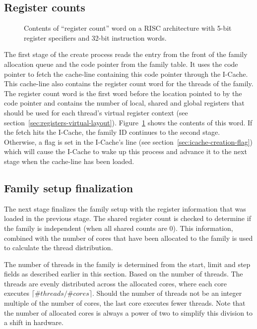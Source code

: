 \subsection{Register counts}

\begin{figure}
 \begin{center}
  
  \caption{Contents of ``register count'' word on a RISC architecture with 5-bit register specifiers and 32-bit instruction words.}
  \label{fig:reg-counts}
 \end{center}
\end{figure}

The first stage of the create process reads the entry from the front of the family allocation queue and the code pointer from the family table. It uses the code pointer to fetch the cache-line containing this code pointer through the I-Cache. This cache-line also contains the register count word for the threads of the family. The register count word is the first word before the location pointed to by the code pointer and contains the number of local, shared and global registers that should be used for each thread's virtual register context (see section~\ref{sec:registers-virtual-layout}). Figure~\ref{fig:reg-counts} shows the contents of this word. If the fetch hits the I-Cache, the family ID continues to the second stage. Otherwise, a flag is set in the I-Cache's line (see section~\ref{sec:icache-creation-flag}) which will cause the I-Cache to wake up this process and advance it to the next stage when the cache-line has been loaded.

\subsection{\label{sec:family-setup-finalization}Family setup finalization}
The next stage finalizes the family setup with the register information that was loaded in the previous stage. The shared register count is checked to determine if the family is independent (when all shared counts are 0). This information, combined with the number of cores that have been allocated to the family is used to calculate the thread distribution.

The number of threads in the family is determined from the start, limit and step fields as described earlier in this section. Based on the number of threads. The threads are evenly distributed across the allocated cores, where each core executes $\lceil \#threads / \#cores \rceil$. Should the number of threads not be an integer multiple of the number of cores, the last core executes fewer threads. Note that the number of allocated cores is always a power of two to simplify this division to a shift in hardware.

